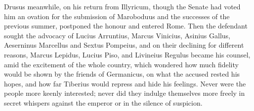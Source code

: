 
Drusus meanwhile, on his return from Illyricum, though the Senate had voted him an ovation for the submission of Maroboduus and the successes of the previous summer, postponed the honour and entered Rome. Then the defendant sought the advocacy of Lucius Arruntius, Marcus Vinicius, Asinius Gallus, Aeserninus Marcellus and Sextus Pompeius, and on their declining for different reasons, Marcus Lepidus, Lucius Piso, and Livineius Regulus became his counsel, amid the excitement of the whole country, which wondered how much fidelity would be shown by the friends of Germanicus, on what the accused rested his hopes, and how far Tiberius would repress and hide his feelings. Never were the people more keenly interested; never did they indulge themselves more freely in secret whispers against the emperor or in the silence of suspicion.


